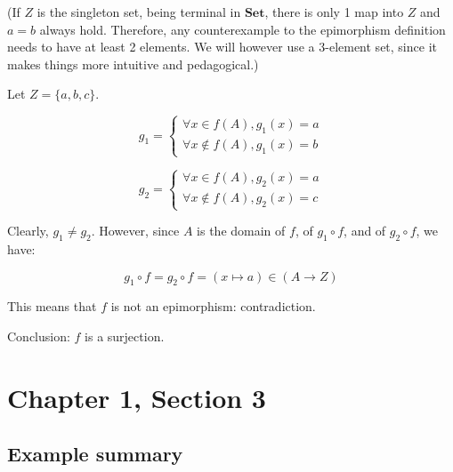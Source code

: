 \documentclass[12pt, letterpaper, twoside]{report}
\begin{document}
(If $Z$ is the singleton set, being terminal in $\mathbf{Set}$, there is only 1 map into $Z$ and $a = b$ always hold. Therefore, any counterexample to the epimorphism definition needs to have at least 2 elements. We will however use a 3-element set, since it makes things more intuitive and pedagogical.)

Let $Z = \{a, b, c\}$.

$$
g_1 =
\begin{cases}
	\forall x    \in f(A), g_1(x) = a \\
	\forall x \notin f(A), g_1(x) = b
\end{cases}
$$

$$
g_2 =
\begin{cases}
	\forall x    \in f(A), g_2(x) = a \\
	\forall x \notin f(A), g_2(x) = c
\end{cases}
$$

Clearly, $g_1 \neq g_2$. However, since $A$ is the domain of $f$, of $g_1 \circ f$, and of $g_2 \circ f$, we have:

$$
g_1 \circ f = g_2 \circ f = (x \mapsto a) \in (A \to Z)
$$

This means that $f$ is not an epimorphism: contradiction.

Conclusion: $f$ is a surjection.
\chapter*{Chapter 1, Section 3}

\section*{Example summary}
\end{document}
